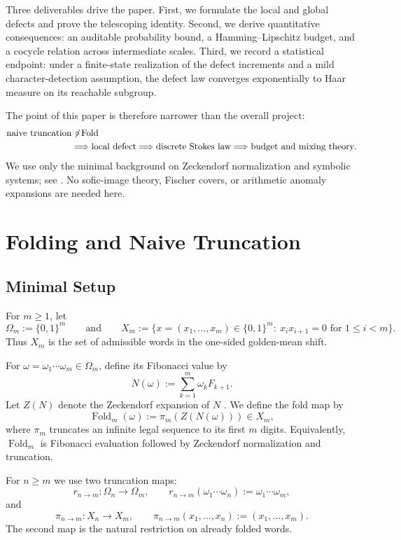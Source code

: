 \documentclass[11pt,letterpaper]{article}
\numberwithin{equation}{section}
\theoremstyle{plain}
\theoremstyle{definition}
\theoremstyle{remark}
\DeclareMathOperator{\Fold}{Fold}
\begin{document}
Three deliverables drive the paper.  First, we formulate the local and global
defects and prove the telescoping identity.  Second, we derive quantitative
consequences: an auditable probability bound, a Hamming--Lipschitz budget, and
a cocycle relation across intermediate scales.  Third, we record a statistical
endpoint: under a finite-state realization of the defect increments and a mild
character-detection assumption, the defect law converges exponentially to Haar
measure on its reachable subgroup.

The point of this paper is therefore narrower than the overall project:
\[
\begin{aligned}
\text{naive truncation}
&\not\!\circ\,\text{Fold} \\
&\Longrightarrow
\text{local defect}
\Longrightarrow
\text{discrete Stokes law}
\Longrightarrow
\text{budget and mixing theory}.
\end{aligned}
\]
We use only the minimal background on Zeckendorf normalization and symbolic
systems; see \cite{Zeckendorf1972,WaltersErgodicTheory,
LevinPeresWilmer2009MarkovMixing,
Internal2026FoldGeneralizedStokesDefectHaarMixing}.  No sofic-image theory,
Fischer covers, or arithmetic anomaly expansions are needed here.

\section{Folding and Naive Truncation}

\subsection{Minimal Setup}

For $m\ge 1$, let
\[
\Omega_m:=\{0,1\}^m
\qquad\text{and}\qquad
X_m:=\{x=(x_1,\dots,x_m)\in\{0,1\}^m:\ x_ix_{i+1}=0\text{ for }1\le i<m\}.
\]
Thus $X_m$ is the set of admissible words in the one-sided golden-mean shift.

For $\omega=\omega_1\cdots\omega_m\in\Omega_m$, define its Fibonacci value by
\[
N(\omega):=\sum_{k=1}^m \omega_k F_{k+1}.
\]
Let $Z(N)$ denote the Zeckendorf expansion of $N$ \cite{Zeckendorf1972}.  We
define the fold map by
\[
\Fold_m(\omega):=\pi_m(Z(N(\omega)))\in X_m,
\]
where $\pi_m$ truncates an infinite legal sequence to its first $m$ digits.
Equivalently, $\Fold_m$ is Fibonacci evaluation followed by Zeckendorf
normalization and truncation.

For $n\ge m$ we use two truncation maps:
\[
r_{n\to m}:\Omega_n\to\Omega_m,
\qquad
r_{n\to m}(\omega_1\cdots\omega_n):=\omega_1\cdots\omega_m,
\]
and
\[
\pi_{n\to m}:X_n\to X_m,
\qquad
\pi_{n\to m}(x_1,\dots,x_n):=(x_1,\dots,x_m).
\]
The second map is the natural restriction on already folded words.
\end{document}
